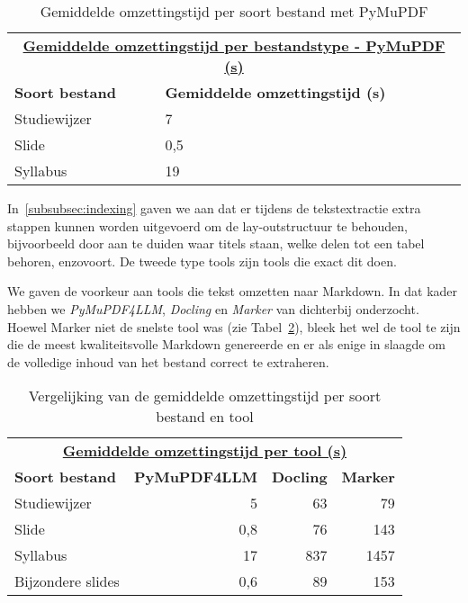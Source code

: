 \begin{table}
    \centering
    \begin{tabular}{p{7cm} p{5cm}}
        \multicolumn{2}{c}{\uline{\textbf{Gemiddelde omzettingstijd per bestandstype - PyMuPDF (s)}}} \\
        \addlinespace[0.5ex]
        \textbf{Soort bestand} & \textbf{Gemiddelde omzettingstijd (s)} \\
        \midrule
        Studiewijzer & 7 \\
        Slide        & 0,5 \\
        Syllabus     & 19 \\
        \bottomrule
    \end{tabular}
    \caption{Gemiddelde omzettingstijd per soort bestand met PyMuPDF}
    \label{tab:pymupdf-omzettingstijden}
\end{table}

In~\ref{subsubsec:indexing} gaven we aan dat er tijdens de tekstextractie extra stappen kunnen worden uitgevoerd om de lay-outstructuur te behouden, bijvoorbeeld door aan te duiden waar titels staan, welke delen tot een tabel behoren, enzovoort. De tweede type tools zijn tools die exact dit doen.

We gaven de voorkeur aan tools die tekst omzetten naar Markdown. In dat kader hebben we \emph{PyMuPDF4LLM}, \emph{Docling} en \emph{Marker} van dichterbij onderzocht. Hoewel Marker niet de snelste tool was (zie Tabel~\ref{tab:markdown-omzettingstijden}), bleek het wel de tool te zijn die de meest kwaliteitsvolle Markdown genereerde en er als enige in slaagde om de volledige inhoud van het bestand correct te extraheren.

\begin{table}
    \centering
    \begin{tabular}{p{4.5cm} r r r}
        \multicolumn{4}{c}{\uline{\textbf{Gemiddelde omzettingstijd per tool (s)}}} \\
        \addlinespace[0.5ex]
        \textbf{Soort bestand} & \textbf{PyMuPDF4LLM} & \textbf{Docling} & \textbf{Marker} \\
        \midrule
        Studiewijzer        & 5    & 63   & 79    \\
        Slide               & 0,8  & 76   & 143   \\
        Syllabus            & 17   & 837  & 1457  \\
        Bijzondere slides   & 0,6  & 89   & 153   \\
        \bottomrule
    \end{tabular}
    \caption{Vergelijking van de gemiddelde omzettingstijd per soort bestand en tool}
    \label{tab:markdown-omzettingstijden}
\end{table}

